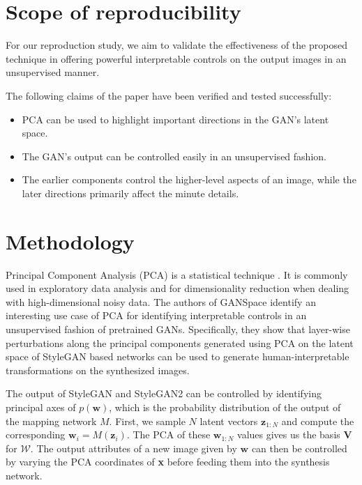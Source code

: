 \section{Scope of reproducibility}
\label{claims}


For our reproduction study, we aim to validate the effectiveness of the proposed technique in offering powerful interpretable controls on the output images in an unsupervised manner.

The following claims of the paper have been verified and tested successfully:
\begin{itemize}[noitemsep]
    \item PCA can be used to highlight important directions in the GAN's latent space.
    \item The GAN's output can be controlled easily in an unsupervised fashion.
    \item The earlier components control the higher-level aspects of an image, while the later directions primarily affect the minute details.
\end{itemize}


\section{Methodology}

Principal Component Analysis (PCA) is a statistical technique . It is commonly used in exploratory data analysis and for dimensionality reduction when dealing with high-dimensional noisy data. The authors of GANSpace identify an interesting use case of PCA for identifying interpretable controls in an unsupervised fashion of pretrained GANs. Specifically, they show that layer-wise perturbations along the principal components generated using PCA on the latent space of StyleGAN based networks can be used to generate human-interpretable transformations on the synthesized images.

The output of StyleGAN and StyleGAN2 can be controlled by identifying principal axes of $p(\textbf{w})$, which is the probability distribution of the output of the mapping network $M$. First, we sample $N$ latent vectors $\textbf{z}_{1:N}$ and compute the corresponding $\textbf{w}_{i} = M(\textbf{z}_{i})$. The PCA of these $\textbf{w}_{1:N}$ values gives us the basis $\textbf{V}$ for $\mathcal{W}$. The output attributes of a new image given by $\textbf{w}$ can then be controlled by varying the PCA coordinates of \textbf{x} before feeding them into the synthesis network. 

